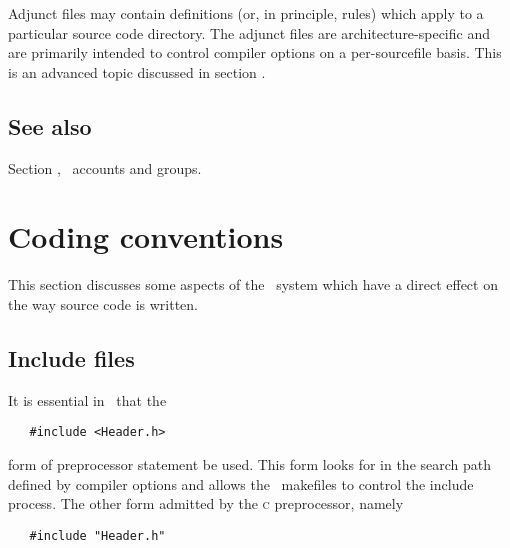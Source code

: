 Adjunct  files may contain definitions (or, in principle,
rules) which apply to a particular source code directory.  The adjunct files
are architecture-specific and are primarily intended to control compiler
options on a per-sourcefile basis.  This is an advanced topic discussed in
section .

\subsection*{See also}

Section , \aipspp\ accounts and groups.


\newpage
\section{Coding conventions}
\label{Coding conventions}

This section discusses some aspects of the \aipspp\ system which have a direct
effect on the way source code is written.

\subsection*{Include files}

It is essential in \aipspp\ that the

\begin{verbatim}
   #include <Header.h>
\end{verbatim}

\noindent
form of preprocessor  statement be used.  This form looks for
 in the search path defined by  compiler options and
allows the \aipspp\ makefiles to control the include process.  The other form
admitted by the \textsc{c} preprocessor, namely

\begin{verbatim}
   #include "Header.h"
\end{verbatim}

